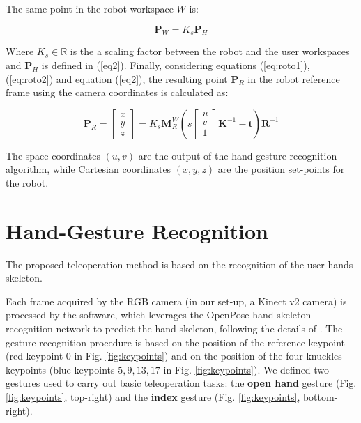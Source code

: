 \documentclass[a4paper, 10 pt, conference]{ieeeconf}      %
\begin{document}
The same point in the robot workspace $W$ is:

\begin{equation}\label{eq:roto2}
\mathbf{P}_{W} = K_s\mathbf{P}_{H}
\end{equation}

Where $K_s\in \mathbb{R}$ is the a scaling factor between the robot and the user workspaces and $\mathbf{P}_{H}$ is defined in (\ref{eq2}). Finally, considering equations (\ref{eq:roto1}), (\ref{eq:roto2}) and equation (\ref{eq2}), the resulting point $\mathbf{P}_R$ in the robot reference frame using the camera coordinates is calculated as:

\begin{equation}
\mathbf{P}_{R} = \begin{bmatrix}
x \\
y \\
z
\end{bmatrix}=
K_s\mathbf{M}^W_{R}
\left(s 
\begin{bmatrix}
u \\
v \\
1
\end{bmatrix}
\mathbf{K}^{-1}-\mathbf{t}\right)\mathbf{R}^{-1}
\end{equation}

The space coordinates $(u,v)$ are the output of the hand-gesture recognition algorithm, while Cartesian coordinates $(x,y,z)$ are the position set-points for the robot.

\section{Hand-Gesture Recognition}\label{sec:HG_recon}

The proposed teleoperation method is based on the recognition of the user hands skeleton.

Each frame acquired by the RGB camera (in our set-up, a Kinect v2 camera) is processed by the software, which leverages the OpenPose hand skeleton recognition network to predict the hand skeleton, following the details of \cite{simon2017hand}.
The gesture recognition procedure is based on the position of the reference keypoint (red keypoint $0$ in Fig. \ref{fig:keypoints}) and on the position of the four knuckles keypoints (blue keypoints $5, 9, 13, 17$ in Fig. \ref{fig:keypoints}). We defined two gestures used to carry out basic teleoperation tasks: the \textbf{open hand} gesture (Fig. \ref{fig:keypoints}, top-right) and the \textbf{index} gesture (Fig. \ref{fig:keypoints}, bottom-right).
\end{document}
